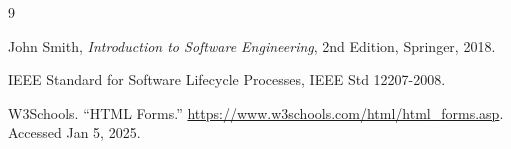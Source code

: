 \begin{thebibliography}{9}
	
	John Smith, \textit{Introduction to Software Engineering}, 2nd Edition, Springer, 2018.
	
	IEEE Standard for Software Lifecycle Processes, IEEE Std 12207-2008.
	
	W3Schools. “HTML Forms.” \url{https://www.w3schools.com/html/html_forms.asp}. Accessed Jan 5, 2025.
	
\end{thebibliography}
